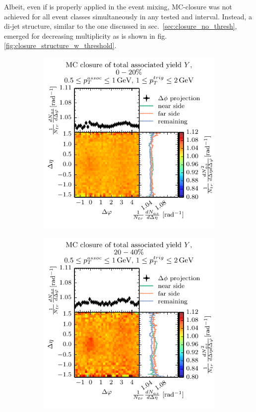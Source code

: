 Albeit, even if \ptthresh is properly applied in the event mixing, MC-closure was not achieved for all event classes simultaneously in any tested \ptassoc and \pttrig interval. Instead, a di-jet structure, similar to the one discussed in sec.~\ref{sec:closure_no_thresh}, emerged for decreasing multiplicity as is shown in fig. \ref{fig:closure_structure_w_threshold}.
\begin{figure}
  \centering
  \begin{subfigure}[b]{0.5\textwidth}
    \includegraphics[width=\textwidth]{figures/closure_structure_class_0.pdf}
  \end{subfigure}%
  \begin{subfigure}[b]{0.5\textwidth}
    \includegraphics[width=\textwidth]{figures/closure_structure_class_1.pdf}

\end{subfigure}
\end{figure}
